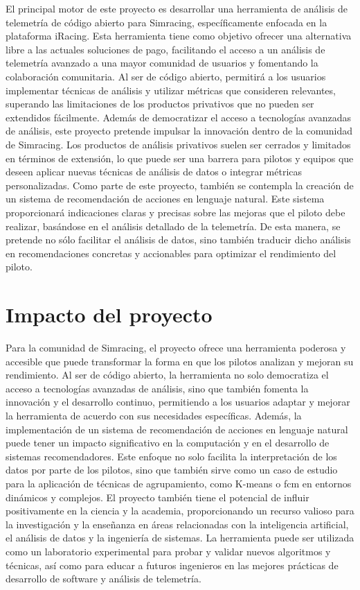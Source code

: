El principal motor de este proyecto es desarrollar una herramienta de análisis de telemetría de código abierto para Simracing, específicamente enfocada en la plataforma iRacing. Esta herramienta tiene como objetivo ofrecer una alternativa libre a las actuales soluciones de pago, facilitando el acceso a un análisis de telemetría avanzado a una mayor comunidad de usuarios y fomentando la colaboración comunitaria. Al ser de código abierto, permitirá a los usuarios implementar técnicas de análisis y utilizar métricas que consideren relevantes, superando las limitaciones de los productos privativos que no pueden ser extendidos fácilmente.
Además de democratizar el acceso a tecnologías avanzadas de análisis, este proyecto pretende impulsar la innovación dentro de la comunidad de Simracing. Los productos de análisis privativos suelen ser cerrados y limitados en términos de extensión, lo que puede ser una barrera para pilotos y equipos que deseen aplicar nuevas técnicas de análisis de datos o integrar métricas personalizadas.
Como parte de este proyecto, también se contempla la creación de un sistema de recomendación de acciones en lenguaje natural. Este sistema proporcionará indicaciones claras y precisas sobre las mejoras que el piloto debe realizar, basándose en el análisis detallado de la telemetría. De esta manera, se pretende no sólo facilitar el análisis de datos, sino también traducir dicho análisis en recomendaciones concretas y accionables para optimizar el rendimiento del piloto.


\section{Impacto del proyecto}

Para la comunidad de Simracing, el proyecto ofrece una herramienta poderosa y accesible que puede transformar la forma en que los pilotos analizan y mejoran su rendimiento. Al ser de código abierto, la herramienta no solo democratiza el acceso a tecnologías avanzadas de análisis, sino que también fomenta la innovación y el desarrollo continuo, permitiendo a los usuarios adaptar y mejorar la herramienta de acuerdo con sus necesidades específicas.
Además, la implementación de un sistema de recomendación de acciones en lenguaje natural puede tener un impacto significativo en la computación y en el desarrollo de sistemas recomendadores. Este enfoque no solo facilita la interpretación de los datos por parte de los pilotos, sino que también sirve como un caso de estudio para la aplicación de técnicas de agrupamiento, como K-means o \ac{fcm} en entornos dinámicos y complejos.
El proyecto también tiene el potencial de influir positivamente en la ciencia y la academia, proporcionando un recurso valioso para la investigación y la enseñanza en áreas relacionadas con la inteligencia artificial, el análisis de datos y la ingeniería de sistemas. La herramienta puede ser utilizada como un laboratorio experimental para probar y validar nuevos algoritmos y técnicas, así como para educar a futuros ingenieros en las mejores prácticas de desarrollo de software y análisis de telemetría.


